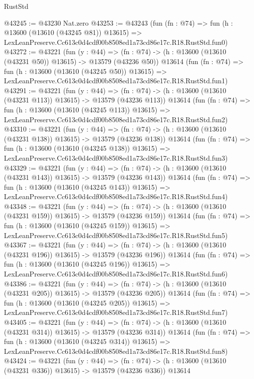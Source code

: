 \begin{lexlean}{RustStd}
\begin{coremodule}
@43245 := @43230 Nat.zero
@43253 := @43243
    (fun (fn : @74) =>
    fun (h : @13600 (@13610 (@43245 @81)) @13615) =>
    LexLeanPreserve.Cc613c0d4cdf00b8508ed1a73cd86e17c.R18.RustStd.fun0)
@43272 := @43221
    (fun (y : @44) =>
    (fn : @74) -> (h : @13600 (@13610 (@43231 @50)) @13615) -> @13579 (@43236 @50))
    @13614
    (fun (fn : @74) =>
    fun (h : @13600 (@13610 (@43245 @50)) @13615) =>
    LexLeanPreserve.Cc613c0d4cdf00b8508ed1a73cd86e17c.R18.RustStd.fun1)
@43291 := @43221
    (fun (y : @44) =>
    (fn : @74) -> (h : @13600 (@13610 (@43231 @113)) @13615) -> @13579 (@43236 @113))
    @13614
    (fun (fn : @74) =>
    fun (h : @13600 (@13610 (@43245 @113)) @13615) =>
    LexLeanPreserve.Cc613c0d4cdf00b8508ed1a73cd86e17c.R18.RustStd.fun2)
@43310 := @43221
    (fun (y : @44) =>
    (fn : @74) -> (h : @13600 (@13610 (@43231 @138)) @13615) -> @13579 (@43236 @138))
    @13614
    (fun (fn : @74) =>
    fun (h : @13600 (@13610 (@43245 @138)) @13615) =>
    LexLeanPreserve.Cc613c0d4cdf00b8508ed1a73cd86e17c.R18.RustStd.fun3)
@43329 := @43221
    (fun (y : @44) =>
    (fn : @74) -> (h : @13600 (@13610 (@43231 @143)) @13615) -> @13579 (@43236 @143))
    @13614
    (fun (fn : @74) =>
    fun (h : @13600 (@13610 (@43245 @143)) @13615) =>
    LexLeanPreserve.Cc613c0d4cdf00b8508ed1a73cd86e17c.R18.RustStd.fun4)
@43348 := @43221
    (fun (y : @44) =>
    (fn : @74) -> (h : @13600 (@13610 (@43231 @159)) @13615) -> @13579 (@43236 @159))
    @13614
    (fun (fn : @74) =>
    fun (h : @13600 (@13610 (@43245 @159)) @13615) =>
    LexLeanPreserve.Cc613c0d4cdf00b8508ed1a73cd86e17c.R18.RustStd.fun5)
@43367 := @43221
    (fun (y : @44) =>
    (fn : @74) -> (h : @13600 (@13610 (@43231 @196)) @13615) -> @13579 (@43236 @196))
    @13614
    (fun (fn : @74) =>
    fun (h : @13600 (@13610 (@43245 @196)) @13615) =>
    LexLeanPreserve.Cc613c0d4cdf00b8508ed1a73cd86e17c.R18.RustStd.fun6)
@43386 := @43221
    (fun (y : @44) =>
    (fn : @74) -> (h : @13600 (@13610 (@43231 @205)) @13615) -> @13579 (@43236 @205))
    @13614
    (fun (fn : @74) =>
    fun (h : @13600 (@13610 (@43245 @205)) @13615) =>
    LexLeanPreserve.Cc613c0d4cdf00b8508ed1a73cd86e17c.R18.RustStd.fun7)
@43405 := @43221
    (fun (y : @44) =>
    (fn : @74) -> (h : @13600 (@13610 (@43231 @314)) @13615) -> @13579 (@43236 @314))
    @13614
    (fun (fn : @74) =>
    fun (h : @13600 (@13610 (@43245 @314)) @13615) =>
    LexLeanPreserve.Cc613c0d4cdf00b8508ed1a73cd86e17c.R18.RustStd.fun8)
@43424 := @43221
    (fun (y : @44) =>
    (fn : @74) -> (h : @13600 (@13610 (@43231 @336)) @13615) -> @13579 (@43236 @336))
    @13614

\end{coremodule}
\end{lexlean}
